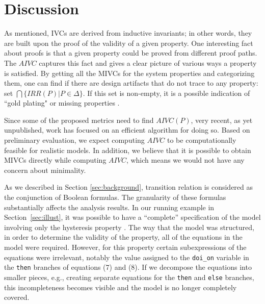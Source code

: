 \section{Discussion}
\label{sec:discussion}
As mentioned, IVCs are derived from inductive invariants; in other words, they are built upon the proof of the validity of a given property. One interesting fact about proofs
  is that a given property could be proved from different proof paths.
  The $AIVC$ captures this fact and gives a clear picture of various ways a property is satisfied. By getting all the MIVCs for the system properties and categorizing them, one can find if there are design artifacts that do not trace to any property: set $\bigcap \{IRR (P) | P \in \Delta \}$.  If this set is non-empty, it is a possible indication of ``gold plating" or missing properties \cite{Murugesan16:renext}.

Since some of the proposed metrics need to find $AIVC (P)$, 
very recent, as yet unpublished, work has focused on an efficient algorithm for doing so. 
Based on preliminary evaluation,
 we expect computing $AIVC$ to be computationally feasible for realistic models. In
addition, we believe that it is possible to obtain MIVCs directly while computing $AIVC$, 
which means we would not have any concern about minimality. 

As we described in Section \ref{sec:background}, transition relation is considered
as the conjunction of Boolean formulas. The granularity of these formulas substantially affects the analysis results.  In our running example in Section~\ref{sec:illust}, it was possible to have a ``complete'' specification of the model involving only the hysteresis property \hystp.  The way that the model was structured, in order to determine the validity of the property, all of the equations in the model were required.  However, for this property certain subexpressions of the equations were irrelevant, notably the value assigned to the \texttt{doi\_on} variable in the \texttt{then} branches of equations (7) and (8).  If we decompose the equations into smaller pieces, e.g., creating separate equations for the \texttt{then} and \texttt{else} branches, this incompleteness becomes visible and the model is no longer completely covered.

